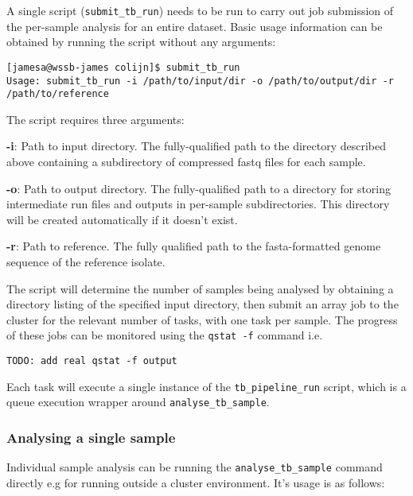 \documentclass[a4paper,10pt,twoside]{article}
\newenvironment{tight_itemize}{
\begin{itemize}
  \setlength{\itemsep}{0pt}
  \setlength{\parskip}{0pt}
}{\end{itemize}}
\begin{document}
A single script ({\tt submit\_tb\_run}) needs to be run to carry out job
submission of the per-sample analysis for an entire dataset. Basic usage
information can be obtained by running the script without any arguments:

\begin{verbatim}
[jamesa@wssb-james colijn]$ submit_tb_run 
Usage: submit_tb_run -i /path/to/input/dir -o /path/to/output/dir -r /path/to/reference
\end{verbatim}

The script requires three arguments:

\begin{tight_itemize}
\item \textbf{-i}: Path to input directory. The fully-qualified path to
the directory described above containing a subdirectory of compressed fastq
files for each sample.
 \item \textbf{-o}: Path to output directory. The fully-qualified path to a
directory for storing intermediate run files and outputs in per-sample
subdirectories. This directory will be created automatically if it doesn't
exist. 
\item \textbf{-r}: Path to reference. The fully qualified path to the
fasta-formatted genome sequence of the reference isolate.
\end{tight_itemize}

The script will determine the number of samples being analysed by obtaining a
directory listing of the specified input directory, then submit an array job to
the cluster for the relevant number of tasks, with one task per sample. The
progress of these jobs can be monitored using the {\tt qstat -f} command i.e. 

\begin{verbatim}
TODO: add real qstat -f output
\end{verbatim}

Each task will execute a single instance of the {\tt tb\_pipeline\_run} script,
which is a queue execution wrapper around {\tt analyse\_tb\_sample}.

\subsubsection {Analysing a single sample}

Individual sample analysis can be running the {\tt analyse\_tb\_sample} command
directly e.g for running outside a cluster environment. It's usage is as follows:
\end{document}
